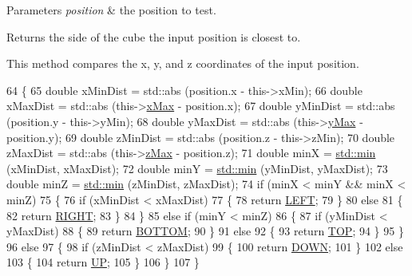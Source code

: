 \begin{DoxyParams}{Parameters}
{\em position} & the position to test. \\
\hline
\end{DoxyParams}
\begin{DoxyReturn}{Returns}
the side of the cube the input position is closest to.
\end{DoxyReturn}
This method compares the x, y, and z coordinates of the input position. 
\begin{DoxyCode}
64 \{
65   \textcolor{keywordtype}{double} xMinDist = std::abs (position.x - this->xMin);
66   \textcolor{keywordtype}{double} xMaxDist = std::abs (this->\hyperlink{classns3_1_1Box_a50021049c756e770329145b25d9533a2}{xMax} - position.x);
67   \textcolor{keywordtype}{double} yMinDist = std::abs (position.y - this->yMin);
68   \textcolor{keywordtype}{double} yMaxDist = std::abs (this->\hyperlink{classns3_1_1Box_a001fd430a14b19efe925c818a332e392}{yMax} - position.y);
69   \textcolor{keywordtype}{double} zMinDist = std::abs (position.z - this->zMin);
70   \textcolor{keywordtype}{double} zMaxDist = std::abs (this->\hyperlink{classns3_1_1Box_ae4d135764bbc8421fe82ec91e4693b59}{zMax} - position.z);
71   \textcolor{keywordtype}{double} minX = \hyperlink{80211b_8c_ac6afabdc09a49a433ee19d8a9486056d}{std::min} (xMinDist, xMaxDist);
72   \textcolor{keywordtype}{double} minY = \hyperlink{80211b_8c_ac6afabdc09a49a433ee19d8a9486056d}{std::min} (yMinDist, yMaxDist);
73   \textcolor{keywordtype}{double} minZ = \hyperlink{80211b_8c_ac6afabdc09a49a433ee19d8a9486056d}{std::min} (zMinDist, zMaxDist);
74   \textcolor{keywordflow}{if} (minX < minY && minX < minZ)
75     \{
76       \textcolor{keywordflow}{if} (xMinDist < xMaxDist)
77         \{
78           \textcolor{keywordflow}{return} \hyperlink{classns3_1_1Box_a30fa910da32787c6c19adcbed2fab47cab866198876b6abfa6b9a1b71e48525df}{LEFT};
79         \}
80       \textcolor{keywordflow}{else}
81         \{
82           \textcolor{keywordflow}{return} \hyperlink{classns3_1_1Box_a30fa910da32787c6c19adcbed2fab47ca26784bec61d164bafa1593567156df5e}{RIGHT};
83         \}
84     \}
85   \textcolor{keywordflow}{else} \textcolor{keywordflow}{if} (minY < minZ)
86     \{
87       \textcolor{keywordflow}{if} (yMinDist < yMaxDist)
88         \{
89           \textcolor{keywordflow}{return} \hyperlink{classns3_1_1Box_a30fa910da32787c6c19adcbed2fab47caa475d832f1dfeff92591f466dd8c084f}{BOTTOM};
90         \}
91       \textcolor{keywordflow}{else}
92         \{
93           \textcolor{keywordflow}{return} \hyperlink{classns3_1_1Box_a30fa910da32787c6c19adcbed2fab47cac9efcb84d7661384dd2cedaf9b0dcc17}{TOP};
94         \}
95     \}
96   \textcolor{keywordflow}{else}
97     \{
98       \textcolor{keywordflow}{if} (zMinDist < zMaxDist)
99         \{
100           \textcolor{keywordflow}{return} \hyperlink{classns3_1_1Box_a30fa910da32787c6c19adcbed2fab47ca9afc8e58f059721e122a75e64b2fb5bb}{DOWN};
101         \}
102       \textcolor{keywordflow}{else}
103         \{
104           \textcolor{keywordflow}{return} \hyperlink{classns3_1_1Box_a30fa910da32787c6c19adcbed2fab47ca3c433b9f9759647cc41b612d535a186e}{UP};
105         \}
106     \}
107 \}
\end{DoxyCode}
